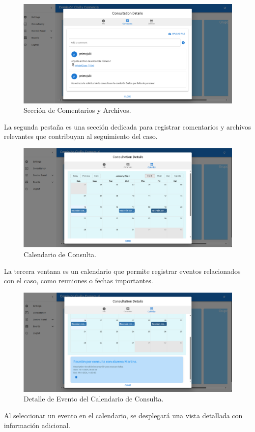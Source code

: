 \begin{figure}[H]
    \centering
    \includegraphics[width=1\linewidth]{fig/comentario-consulta.png}
    \caption{Sección de Comentarios y Archivos.}
    \label{fig:consulta-comentarios}
\end{figure}

La segunda pestaña es una sección dedicada para registrar comentarios y archivos relevantes que contribuyan al seguimiento del caso.

\begin{figure}[H]
    \centering
    \includegraphics[width=1\linewidth]{fig/consulta-calendar-1.png}
    \caption{Calendario de Consulta.}
    \label{fig:consulta-calendar-1}
\end{figure}

La tercera ventana es un calendario que permite registrar eventos relacionados con el caso, como reuniones o fechas importantes.

\begin{figure}[H]
    \centering
    \includegraphics[width=1\linewidth]{fig/consulta-calendar-2.png}
    \caption{Detalle de Evento del Calendario de Consulta.}
    \label{fig:consulta-calendar-2}
\end{figure}
Al seleccionar un evento en el calendario, se desplegará una vista detallada con información adicional.

